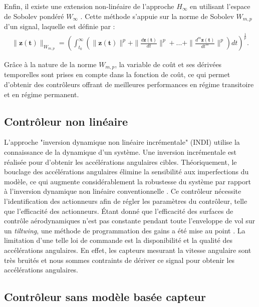 Enfin, il existe une extension non-linéaire de l'approche $H_{\infty}$ en utilisant l'espace de Sobolev pondéré $W_{\infty}$ \cite{cardoso2018nonlinear, CardosoEsteban2019, cardoso2021robust, cardoso2024robust}. Cette méthode s'appuie sur la norme de Sobolev $W_{m,p}$  d'un signal, laquelle est définie par :
\begin{align*}
    \|\boldsymbol{z(t)}\|_{W_{m,p}} = \left( \int_{t_{0}}^{\infty}(\|\boldsymbol{z(t)}\|^{p} + \|\frac{d \boldsymbol{z(t)}}{dt}\|^{p} + ... + \|\frac{d^{m} \boldsymbol{z(t)}}{dt^{m}}\|^{p}) dt \right)^{\frac{1}{p}}.
\end{align*}  

Grâce à la nature de la norme $W_{m,p}$, la variable de coût et ses dérivées temporelles sont prises en compte dans la fonction de coût, ce qui permet d'obtenir des contrôleurs offrant de meilleures performances en régime transitoire et en régime permanent.

\subsection*{Contrôleur non linéaire}

L'approche "inversion dynamique non linéaire incrémentale" (INDI) utilise la connaissance de la dynamique d'un système. Une inversion incrémentale est réalisée pour d'obtenir les accélérations angulaires cibles. Théoriquement, le bouclage des accélérations angulaires élimine la sensibilité aux imperfections du modèle, ce qui augmente considérablement la robustesse du système par rapport à l'inversion dynamique non linéaire conventionnelle \cite{Sieberling2010, Binz2019}. Ce contrôleur nécessite l'identification des actionneurs afin de régler les paramètres du contrôleur, telle que l'efficacité des actionneurs. Étant donné que l'efficacité des surfaces de contrôle aérodynamiques n'est pas constante pendant toute l'enveloppe de vol sur un \textit{tiltwing}, une méthode de programmation des gains a été mise au point \cite{smeurINDI,smeurINDITail}.
La limitation d'une telle loi de commande est la disponibilité et la qualité  des accélérations angulaires. En effet, les capteurs mesurant la vitesse angulaire sont très bruités et nous sommes contraints de dériver ce signal pour obtenir les accélérations angulaires.



\subsection*{Contrôleur sans modèle basée capteur}

